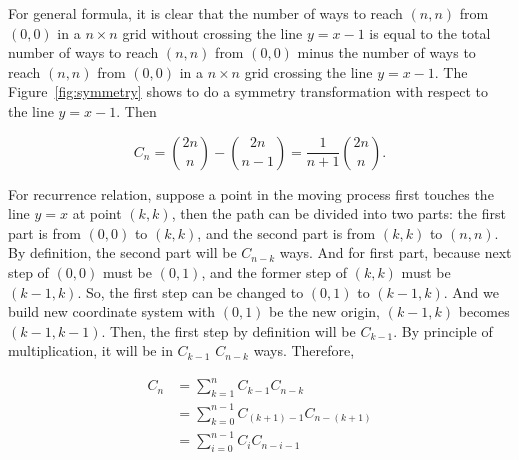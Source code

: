 For general formula, it is clear that the number of ways to reach $(n, n)$ from $(0, 0)$ in a $n \times n$ grid without crossing the line $y = x-1$ is equal to the total number of ways to reach $(n, n)$ from $(0, 0)$ minus the number of ways to reach $(n, n)$ from $(0, 0)$ in a $n \times n$ grid crossing the line $y = x-1$. The Figure~\ref{fig:symmetry} shows to do a symmetry transformation with respect to the line $y = x-1$. Then

\begin{equation}
    C_n = \binom{2n}{n} - \binom{2n}{n-1} = \frac{1}{n+1}\binom{2n}{n}.
\end{equation}

For recurrence relation, suppose a point in the moving process first touches the line $y=x$ at point $(k,k)$, then the path can be divided into two parts: the first part is from $(0,0)$ to $(k,k)$, and the second part is from $(k,k)$ to $(n,n)$. By definition, the second part will be $C_{n-k}$ ways. And for first part, because next step of $(0,0)$ must be $(0,1)$, and the former step of $(k,k)$ must be $(k-1,k)$. So, the first step can be changed to $(0,1)$ to $(k-1,k)$. And we build new coordinate system with $(0,1)$ be the new origin, $(k-1,k)$ becomes $(k-1,k-1)$. Then, the first step by definition will be $C_{k-1}$. By principle of multiplication, it will be in $C_{k-1}$  $C_{n-k}$ ways. Therefore,

\begin{equation}
    \begin{aligned}
        C_{n}& =\sum_{k=1}^nC_{k-1}C_{n-k}  \\
        &=\sum_{k=0}^{n-1}C_{(k+1)-1}C_{n-(k+1)} \\
        &=\sum_{i=0}^{n-1}C_iC_{n-i-1}
    \end{aligned}
\end{equation}